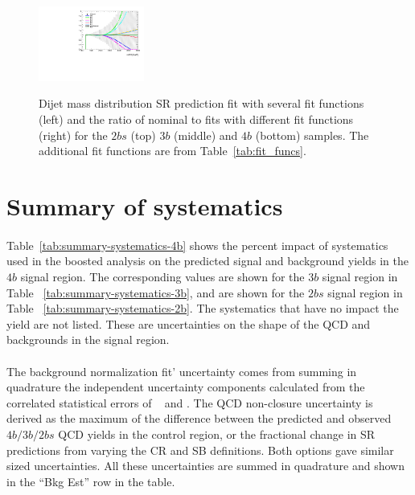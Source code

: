 \begin{figure}[htb!]
\begin{center}
\includegraphics[width=0.31\textwidth,angle=-90]{figures/boosted/Syst_Smooth/smoothFuncCompare_44_comp_ratio.pdf} \\
\caption{ Dijet mass distribution SR prediction fit with several fit functions (left) and the ratio of nominal to fits with different fit functions (right)  for the $2bs$ (top) $3b$ (middle) and $4b$ (bottom) samples. The additional fit functions are from Table~\ref{tab:fit_funcs}.}
\label{fig:qcd_fit_funcs_sys}
\end{center}
\end{figure}


\section{Summary of systematics}
\label{sec:boosted-systematics-numbers}

\paragraph{}
Table~\ref{tab:summary-systematics-4b} shows the percent impact of systematics used in the boosted analysis on the predicted signal and background yields in the $4b$ signal region.
The corresponding values are shown for the $3b$ signal region in Table ~\ref{tab:summary-systematics-3b}, and are shown for the $2bs$ signal region in Table ~\ref{tab:summary-systematics-2b}.
The systematics that have no impact the yield are not listed. 
These are uncertainties on the shape of the QCD and \ttbar~ backgrounds in the signal region.

\paragraph{}
The background normalization fit' uncertainty comes from summing in quadrature the independent uncertainty components calculated from the correlated statistical errors of \muqcd~ and \alphatt. 
The QCD non-closure uncertainty is derived as the maximum of the difference between the predicted and observed $4b/3b/2bs$ QCD yields in the control region, or the fractional change in SR predictions from varying the CR and SB definitions.
Both options gave similar sized uncertainties. 
All these uncertainties are summed in quadrature and shown in the ``Bkg Est'' row in the table.

